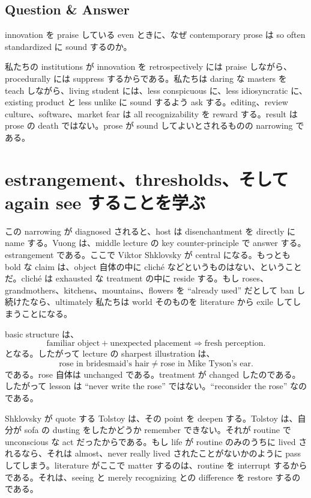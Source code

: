\subsection{Question \& Answer}

innovation を praise している even ときに、なぜ contemporary prose は so often standardized に sound するのか。

私たちの institutions が innovation を retrospectively には praise しながら、procedurally には suppress するからである。私たちは daring な masters を teach しながら、living student には、less conspicuous に、less idiosyncratic に、existing product と less unlike に sound するよう ask する。editing、review culture、software、market fear は all recognizability を reward する。result は prose の death ではない。prose が sound してよいとされるものの narrowing である。

\section{estrangement、thresholds、そして again see することを学ぶ}

この narrowing が diagnosed されると、host は disenchantment を directly に name する。Vuong は、middle lecture の key counter-principle で answer する。estrangement である。ここで Viktor Shklovsky が central になる。もっとも bold な claim は、object 自体の中に cliché などというものはない、ということだ。cliché は exhausted な treatment の中に reside する。もし roses、grandmothers、kitchens、mountains、flowers を ``already used'' だとして ban し続けたなら、ultimately 私たちは world そのものを literature から exile してしまうことになる。

basic structure は、
\begin{equation}
\text{familiar object} + \text{unexpected placement} \Longrightarrow \text{fresh perception}.
\end{equation}
となる。したがって lecture の sharpest illustration は、
\begin{equation}
\text{rose in bridesmaid's hair} \neq \text{rose in Mike Tyson's ear}.
\end{equation}
である。rose 自体は unchanged である。treatment が changed したのである。したがって lesson は ``never write the rose'' ではない。``reconsider the rose'' なのである。

Shklovsky が quote する Tolstoy は、その point を deepen する。Tolstoy は、自分が sofa の dusting をしたかどうか remember できない。それが routine で unconscious な act だったからである。もし life が routine のみのうちに lived されるなら、それは almost、never really lived されたことがないかのように pass してしまう。literature がここで matter するのは、routine を interrupt するからである。それは、seeing と merely recognizing との difference を restore するのである。

